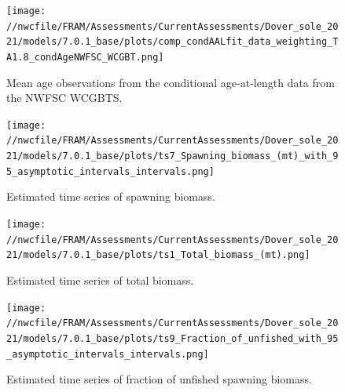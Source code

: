 \documentclass[11pt,
  english,
  a4paper,
]{article}
\begin{document}
\tagmcend\tagstructend


\begin{figure}
\centering
\texttt{[image: //nwcfile/FRAM/Assessments/CurrentAssessments/Dover\_sole\_2021/models/7.0.1\_base/plots/comp\_condAALfit\_data\_weighting\_TA1.8\_condAgeNWFSC\_WCGBT.png]}
\caption{Mean age observations from the conditional age-at-length data from the NWFSC WCGBTS.\label{fig:wcgbt-mean-age}}
\end{figure}

\tagmcend\tagstructend


\begin{figure}
\centering
\texttt{[image: //nwcfile/FRAM/Assessments/CurrentAssessments/Dover\_sole\_2021/models/7.0.1\_base/plots/ts7\_Spawning\_biomass\_(mt)\_with\_95\_asymptotic\_intervals\_intervals.png]}
\caption{Estimated time series of spawning biomass.\label{fig:ssb}}
\end{figure}

\tagmcend\tagstructend


\begin{figure}
\centering
\texttt{[image: //nwcfile/FRAM/Assessments/CurrentAssessments/Dover\_sole\_2021/models/7.0.1\_base/plots/ts1\_Total\_biomass\_(mt).png]}
\caption{Estimated time series of total biomass.\label{fig:tot-bio}}
\end{figure}

\tagmcend\tagstructend


\begin{figure}
\centering
\texttt{[image: //nwcfile/FRAM/Assessments/CurrentAssessments/Dover\_sole\_2021/models/7.0.1\_base/plots/ts9\_Fraction\_of\_unfished\_with\_95\_asymptotic\_intervals\_intervals.png]}
\caption{Estimated time series of fraction of unfished spawning biomass.\label{fig:depl}}
\end{figure}

\tagmcend\tagstructend
\end{document}
